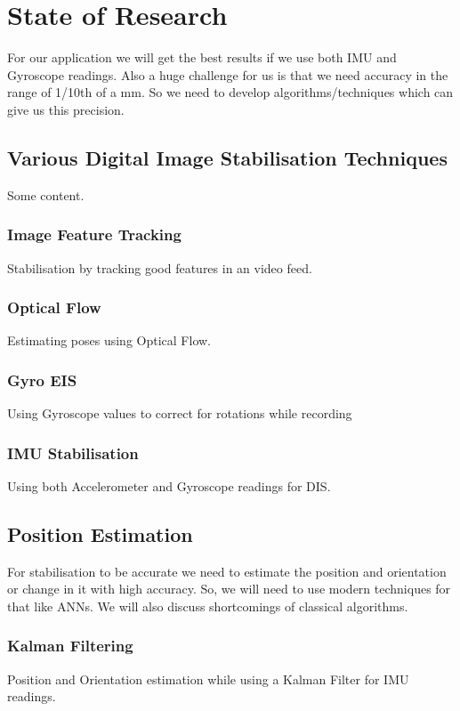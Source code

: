 \chapter{State of Research} \label{chapter_two}

For our application we will get the best results if we use both IMU and Gyroscope readings. 
Also a huge challenge for us is that we need accuracy in the range of 1/10th of a mm. So we need to develop algorithms/techniques which can give us this precision.

\section{Various Digital Image Stabilisation Techniques}

Some content.
\subsection{Image Feature Tracking}
Stabilisation by tracking good features in an video feed.

\subsection{Optical Flow}
Estimating poses using Optical Flow.

\subsection{Gyro EIS}
Using Gyroscope values to correct for rotations while recording

\subsection{IMU Stabilisation}
Using both Accelerometer and Gyroscope readings for DIS.

\section{Position Estimation}

For stabilisation to be accurate we need to estimate the position and orientation or change in it with high accuracy. So, we will need to use modern techniques for that like ANNs. We will also discuss shortcomings of classical algorithms.

\subsection{Kalman Filtering}
Position and Orientation estimation while using a Kalman Filter for IMU readings.


